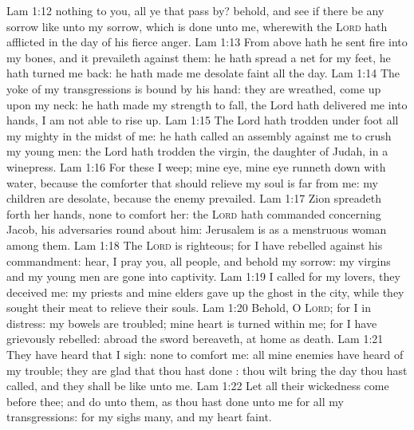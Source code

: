 \vs Lam 1:12  nothing to you, all ye that pass by? behold, and see if there be any sorrow like unto my sorrow, which is done unto me, wherewith the \textsc{Lord} hath afflicted  in the day of his fierce anger.
\vs Lam 1:13 From above hath he sent fire into my bones, and it prevaileth against them: he hath spread a net for my feet, he hath turned me back: he hath made me desolate  faint all the day.
\vs Lam 1:14 The yoke of my transgressions is bound by his hand: they are wreathed,  come up upon my neck: he hath made my strength to fall, the Lord hath delivered me into  hands,  I am not able to rise up.
\vs Lam 1:15 The Lord hath trodden under foot all my mighty  in the midst of me: he hath called an assembly against me to crush my young men: the Lord hath trodden the virgin, the daughter of Judah,  in a winepress.
\vs Lam 1:16 For these  I weep; mine eye, mine eye runneth down with water, because the comforter that should relieve my soul is far from me: my children are desolate, because the enemy prevailed.
\vs Lam 1:17 Zion spreadeth forth her hands,  none to comfort her: the \textsc{Lord} hath commanded concerning Jacob,  his adversaries  round about him: Jerusalem is as a menstruous woman among them.
\vs Lam 1:18 The \textsc{Lord} is righteous; for I have rebelled against his commandment: hear, I pray you, all people, and behold my sorrow: my virgins and my young men are gone into captivity.
\vs Lam 1:19 I called for my lovers,  they deceived me: my priests and mine elders gave up the ghost in the city, while they sought their meat to relieve their souls.
\vs Lam 1:20 Behold, O \textsc{Lord}; for I  in distress: my bowels are troubled; mine heart is turned within me; for I have grievously rebelled: abroad the sword bereaveth, at home  as death.
\vs Lam 1:21 They have heard that I sigh:  none to comfort me: all mine enemies have heard of my trouble; they are glad that thou hast done : thou wilt bring the day  thou hast called, and they shall be like unto me.
\vs Lam 1:22 Let all their wickedness come before thee; and do unto them, as thou hast done unto me for all my transgressions: for my sighs  many, and my heart  faint.
